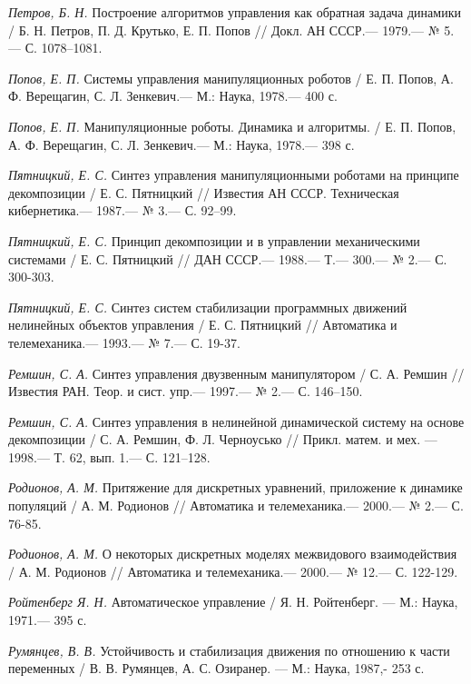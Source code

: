 \begin{thebibliography}{10}
	{\it Петров, Б. Н.} Построение алгоритмов управления как обратная задача динамики / Б. Н. Петров, П. Д. Крутько, Е. П. Попов // Докл. АН СССР.— 1979.— № 5.— С. 1078–1081.
	
	{\it Попов, Е. П.} Системы управления манипуляционных роботов / Е. П. Попов, А. Ф. Верещагин,
	С. Л. Зенкевич.— М.: Наука, 1978.— 400 с.
	
	{\it Попов, Е. П.} Манипуляционные роботы. Динамика и алгоритмы. / Е. П. Попов, А. Ф. Верещагин,
	С. Л. Зенкевич.— М.: Наука, 1978.— 398 с.
	
	{\it Пятницкий, Е. С.} Синтез управления манипуляционными роботами на принципе декомпозиции
	/ Е. С. Пятницкий // Известия АН СССР. Техническая кибернетика.—
	1987.— № 3.— С. 92–99.
	
	{\it Пятницкий, Е. С.} Принцип декомпозиции и в управлении механическими системами
	/ Е. С. Пятницкий // ДАН СССР.— 1988.— Т.— 300.— № 2.— С. 300-303.
	
	{\it Пятницкий, Е. С.} Синтез систем стабилизации программных движений нелинейных объектов управления
	/ Е. С. Пятницкий // Автоматика и телемеханика.— 1993.— № 7.— С. 19-37.
	
	{\it Ремшин, С. А.} Синтез управления двузвенным манипулятором /
	С. А. Ремшин // Известия РАН. Теор. и сист. упр.— 1997.— № 2.— С. 146–150.
	
	{\it Ремшин, С. А.} Синтез управления в нелинейной динамической систему на основе декомпозиции /
	С. А. Ремшин, Ф. Л. Черноусько // Прикл. матем. и мех. — 1998.— Т. 62, вып. 1.— С. 121–128.
	
	
	{\it Родионов, А. М.} Притяжение для дискретных уравнений, приложение к динамике популяций
	/ А. М. Родионов // Автоматика и телемеханика.— 2000.— № 2.— С. 76-85.
	
	{\it Родионов, А. М.} О некоторых дискретных моделях межвидового взаимодействия
	/ А. М. Родионов // Автоматика и телемеханика.— 2000.— № 12.— С. 122-129.
	
	{\it Ройтенберг Я. Н.} Автоматическое управление /
	Я. Н. Ройтенберг. — М.: Наука, 1971.— 395 с.
	
	{\it Румянцев, В. В.} Устойчивость и стабилизация движения по отношению к части переменных /
	В. В. Румянцев, А. С. Озиранер. — М.: Наука, 1987,- 253 с.
	

\end{thebibliography}
